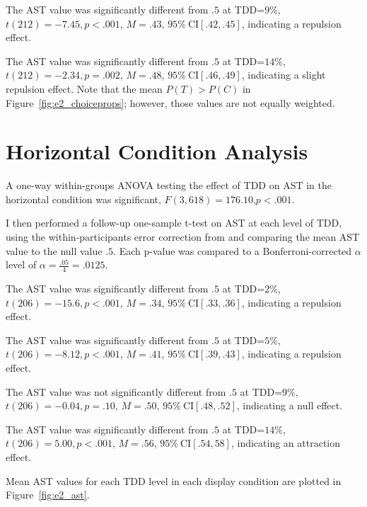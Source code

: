 The AST value was significantly different from $.5$ at TDD=$9\%$, $\mathit{t}(212)=-7.45,\textit{p}<.001$, $\mathit{M}=.43$, $95\%\ \mathrm{CI}[.42,.45]$, indicating a repulsion effect. 

The AST value was significantly different from $.5$ at TDD=$14\%$, $\mathit{t}(212)=-2.34,\textit{p}=.002$, $\mathit{M}=.48$, $95\%\ \mathrm{CI}[.46,.49]$, indicating a slight repulsion effect. Note that the mean $P(T)>P(C)$ in Figure~\ref{fig:e2_choiceprops}; however, those values are not equally weighted.

\section{Horizontal Condition Analysis}
A one-way within-groups ANOVA testing the effect of TDD on AST in the horizontal condition was significant, $\mathit{F}(3,618)=176.10$,$\mathit{p}<.001$. 

I then performed a follow-up one-sample t-test on AST at each level of TDD, using the within-participants error correction from \textcite{cousineau2014error} and comparing the mean AST value to the null value $.5$. Each p-value was compared to a Bonferroni-corrected $\alpha$ level of $\alpha=\frac{.05}{4}=.0125$. 

The AST value was significantly different from $.5$ at TDD=$2\%$, $\mathit{t}(206)=-15.6,\textit{p}<.001$, $\mathit{M}=.34$, $95\%\ \mathrm{CI}[.33,.36]$, indicating a repulsion effect. 

The AST value was significantly different from $.5$ at TDD=$5\%$, $\mathit{t}(206)=-8.12,\textit{p}<.001$, $\mathit{M}=.41$, $95\%\ \mathrm{CI}[.39,.43]$, indicating a repulsion effect. 

The AST value was not significantly different from $.5$ at TDD=$9\%$, $\mathit{t}(206)=-0.04,\textit{p}=.10$, $\mathit{M}=.50$, $95\%\ \mathrm{CI}[.48,.52]$, indicating a null effect. 

The AST value was significantly different from $.5$ at TDD=$14\%$, $\mathit{t}(206)=5.00,\textit{p}<.001$, $\mathit{M}=.56$, $95\%\ \mathrm{CI}[.54,58]$, indicating an attraction effect. 

Mean AST values for each TDD level in each display condition are plotted in Figure~\ref{fig:e2_ast}.

